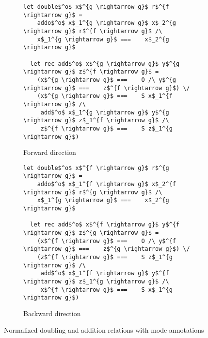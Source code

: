 \begin{figure*}[t!]
  \centering
  \begin{subfigure}[b]{0.45\textwidth}
    \begin{lstlisting}[frame=tb]
  let double$^o$ x$^{g \rightarrow g}$ r$^{f \rightarrow g}$ =
    addo$^o$ x$_1^{g \rightarrow g}$ x$_2^{g \rightarrow g}$ r$^{f \rightarrow g}$ /\
    x$_1^{g \rightarrow g}$ ===    x$_2^{g \rightarrow g}$

  let rec add$^o$ x$^{g \rightarrow g}$ y$^{g \rightarrow g}$ z$^{f \rightarrow g}$ =
    (x$^{g \rightarrow g}$ ===    O /\ y$^{g \rightarrow g}$ ===    z$^{f \rightarrow g}$) \/
    (x$^{g \rightarrow g}$ ===    S x$_1^{f \rightarrow g}$ /\
     add$^o$ x$_1^{g \rightarrow g}$ y$^{g \rightarrow g}$ z$_1^{f \rightarrow g}$ /\
     z$^{f \rightarrow g}$ ===    S z$_1^{g \rightarrow g}$)
    \end{lstlisting}
    \caption{Forward direction}
    \label{fig:double_fwd}
  \end{subfigure}
\hfill
  \begin{subfigure}[b]{0.45\textwidth}
    \begin{lstlisting}[frame=tb]
  let double$^o$ x$^{f \rightarrow g}$ r$^{g \rightarrow g}$ =
    addo$^o$ x$_1^{f \rightarrow g}$ x$_2^{f \rightarrow g}$ r$^{g \rightarrow g}$ /\
    x$_1^{g \rightarrow g}$ ===    x$_2^{g \rightarrow g}$

  let rec add$^o$ x$^{f \rightarrow g}$ y$^{f \rightarrow g}$ z$^{g \rightarrow g}$ =
    (x$^{f \rightarrow g}$ ===    O /\ y$^{f \rightarrow g}$ ===    z$^{g \rightarrow g}$) \/
    (z$^{f \rightarrow g}$ ===    S z$_1^{g \rightarrow g}$ /\
     add$^o$ x$_1^{f \rightarrow g}$ y$^{f \rightarrow g}$ z$_1^{g \rightarrow g}$ /\
     x$^{f \rightarrow g}$ ===    S x$_1^{g \rightarrow g}$)
    \end{lstlisting}
    \caption{Backward direction}
    \label{fig:double_bw}
  \end{subfigure}
  \caption{Normalized doubling and addition relations with mode annotations}
  \label{fig:double_modded}
\end{figure*}
